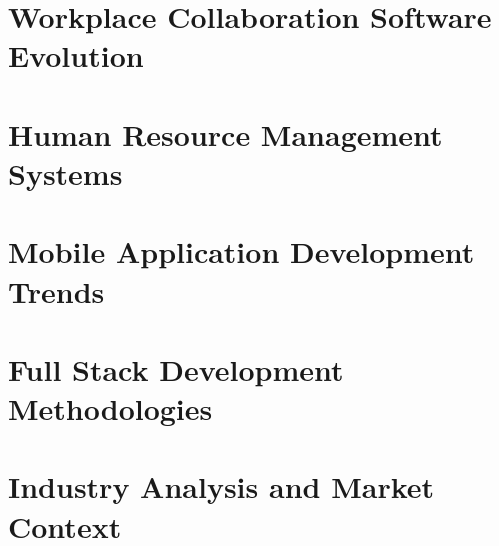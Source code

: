 \lipsum
\section{Workplace Collaboration Software Evolution}
 \section{Human Resource Management Systems}
 \section{Mobile Application Development Trends}
 \section{Full Stack Development Methodologies}
 \section{Industry Analysis and Market Context}